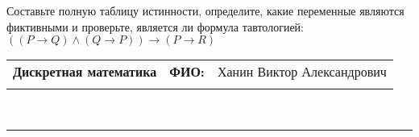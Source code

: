 \documentclass[10pt]{exam}
\newcommand{\class}{Дискретная математика}
\newcommand{\examdate}{}
\begin{document}
\begin{questions}
\begin{enumerate} [a)]
\end{enumerate}\question Составьте полную таблицу истинности, определите, какие переменные являются фиктивными и проверьте, является ли формула тавтологией:
$(( P \rightarrow Q) \land (Q \rightarrow P)) \rightarrow (P \rightarrow R)$

\end{questions}
\newpage
\begin{flushright}
\begin{tabular}{p{2.8in} r l}
\textbf{\class} & \textbf{ФИО:} &Ханин Виктор Александрович
\\

\textbf{\examdate} &&\\
\end{tabular}\\
\end{flushright}
\rule[1ex]{\textwidth}{.1pt}
\end{document}
